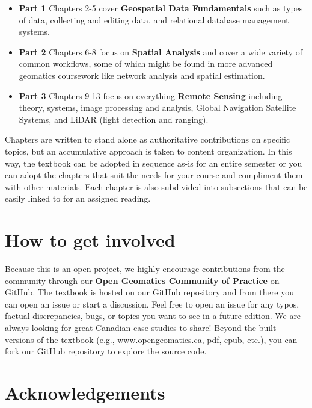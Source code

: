 \documentclass[
]{book}
\providecommand{\tightlist}{%
  \setlength{\itemsep}{0pt}\setlength{\parskip}{0pt}}
\begin{document}
\begin{itemize}
\tightlist
\item
  \textbf{Part 1} Chapters 2-5 cover \textbf{Geospatial Data Fundamentals} such as types of data, collecting and editing data, and relational database management systems.
\item
  \textbf{Part 2} Chapters 6-8 focus on \textbf{Spatial Analysis} and cover a wide variety of common workflows, some of which might be found in more advanced geomatics coursework like network analysis and spatial estimation.
\item
  \textbf{Part 3} Chapters 9-13 focus on everything \textbf{Remote Sensing} including theory, systems, image processing and analysis, Global Navigation Satellite Systems, and LiDAR (light detection and ranging).
\end{itemize}

Chapters are written to stand alone as authoritative contributions on specific topics, but an accumulative approach is taken to content organization. In this way, the textbook can be adopted in sequence as-is for an entire semester or you can adopt the chapters that suit the needs for your course and compliment them with other materials. Each chapter is also subdivided into subsections that can be easily linked to for an assigned reading.

\section*{How to get involved}\label{how-to-get-involved}

Because this is an open project, we highly encourage contributions from the community through our \textbf{Open Geomatics Community of Practice} on GitHub. The textbook is hosted on our GitHub repository and from there you can open an issue or start a discussion. Feel free to open an issue for any typos, factual discrepancies, bugs, or topics you want to see in a future edition. We are always looking for great Canadian case studies to share! Beyond the built versions of the textbook (e.g., \href{http://www.opengeomatics.ca}{www.opengeomatics.ca}, pdf, epub, etc.), you can fork our GitHub repository to explore the source code.

\section*{Acknowledgements}\label{acknowledgements}
\end{document}
